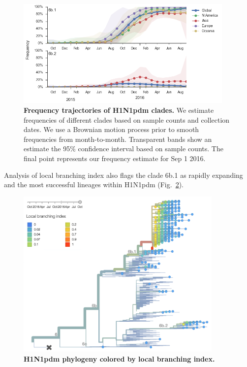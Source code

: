 \documentclass[11pt,oneside,letterpaper]{article}
\begin{document}
\begin{figure}[H]
	\centering
	\includegraphics[width=0.95\textwidth]{../figures/sep-2016/H1N1pdm_clades.png}
	\caption{\textbf{Frequency trajectories of H1N1pdm clades.}
	We estimate frequencies of different clades based on sample counts and collection dates.
	We use a Brownian motion process prior to smooth frequencies from month-to-month.
	Transparent bands show an estimate the 95\% confidence interval based on sample counts.
	The final point represents our frequency estimate for Sep 1 2016.
	}
	\label{H1N1pdm_clades}
\end{figure}

\pagebreak

Analysis of local branching index \cite{neher2014predicting} also flags the clade 6b.1 as rapidly expanding and the most successful lineages within H1N1pdm (Fig.\ \ref{H1N1pdm_LBI}).

\begin{figure}[H]
	\centering
	\includegraphics[width=0.9\textwidth]{../figures/sep-2016/H1N1pdm_LBI.png}
	\caption{\textbf{H1N1pdm phylogeny colored by local branching index.}
	}
	\label{H1N1pdm_LBI}
\end{figure}
\end{document}

